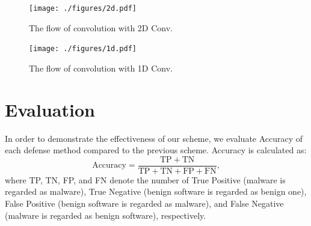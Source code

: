 \documentclass{ieeeaccess}
\begin{document}
\begin{figure}[t]
 \centering
 \texttt{[image: ./figures/2d.pdf]}
 \caption{The flow of convolution with 2D Conv.}
 \label{fig:2d}
\end{figure}
\begin{figure}[t]
 \centering
 \texttt{[image: ./figures/1d.pdf]}
    \caption{The flow of convolution with 1D Conv.}
 \label{fig:1d}
\end{figure}

\section{Evaluation} \label{sec:evaluation}
In order to demonstrate the effectiveness of our scheme, we evaluate Accuracy of each defense method compared to the previous scheme.
Accuracy is calculated as:
\begin{equation}
  \mathrm{Accuracy} = \frac{\mathrm{TP}+\mathrm{TN}}{\mathrm{TP} + \mathrm{TN} + \mathrm{FP} + \mathrm{FN}}, 
\end{equation}
where TP, TN, FP, and FN denote the number of True Positive (malware is regarded as malware), True Negative (benign software is regarded as benign one), False Positive (benign software is regarded as malware), and False Negative (malware is regarded as benign software), respectively.
\end{document}
